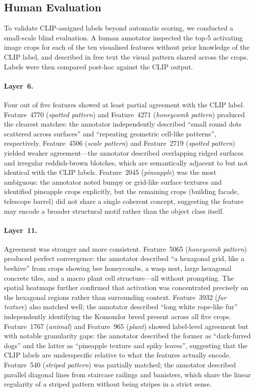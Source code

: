 \subsection{Human Evaluation}

To validate CLIP-assigned labels beyond automatic scoring, we conducted a small-scale blind evaluation. A human annotator inspected the top-5 activating image crops for each of the ten visualised features without prior knowledge of the CLIP label, and described in free text the visual pattern shared across the crops. Labels were then compared post-hoc against the CLIP output.

\paragraph{Layer~6.} Four out of five features showed at least partial agreement with the CLIP label. Feature~4770 (\textit{spotted pattern}) and Feature~4271 (\textit{honeycomb pattern}) produced the clearest matches: the annotator independently described ``small round dots scattered across surfaces'' and ``repeating geometric cell-like patterns'', respectively. Feature~4506 (\textit{scale pattern}) and Feature~2719 (\textit{spotted pattern}) yielded weaker agreement---the annotator described overlapping ridged surfaces and irregular reddish-brown blotches, which are semantically adjacent to but not identical with the CLIP labels. Feature~2045 (\textit{pineapple}) was the most ambiguous: the annotator noted bumpy or grid-like surface textures and identified pineapple crops explicitly, but the remaining crops (building facade, telescope barrel) did not share a single coherent concept, suggesting the feature may encode a broader structural motif rather than the object class itself.

\paragraph{Layer~11.} Agreement was stronger and more consistent. Feature~5065 (\textit{honeycomb pattern}) produced perfect convergence: the annotator described ``a hexagonal grid, like a beehive'' from crops showing bee honeycombs, a wasp nest, large hexagonal concrete tiles, and a macro plant cell structure---all without prompting. The spatial heatmaps further confirmed that activation was concentrated precisely on the hexagonal regions rather than surrounding context. Feature~3932 (\textit{fur texture}) also matched well; the annotator described ``long white rope-like fur'' independently identifying the Komondor breed present across all five crops. Feature~1767 (\textit{animal}) and Feature~965 (\textit{plant}) showed label-level agreement but with notable granularity gaps: the annotator described the former as ``dark-furred dogs'' and the latter as ``pineapple texture and spiky leaves'', suggesting that the CLIP labels are underspecific relative to what the features actually encode. Feature~540 (\textit{striped pattern}) was partially matched; the annotator described parallel diagonal lines from staircase railings and banisters, which share the linear regularity of a striped pattern without being stripes in a strict sense.

